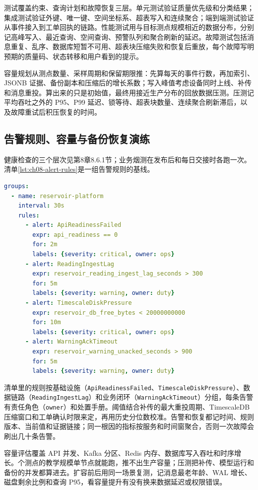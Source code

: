 测试覆盖约束、查询计划和故障恢复三层。单元测试验证质量优先级和分类结果；集成测试验证外键、唯一键、空间坐标系、超表写入和连续聚合；端到端测试验证从事件接入到工单回执的链路。性能测试用与目标测点规模相近的数据分布，分别记高峰写入、最近查询、空间查询、预警队列和聚合刷新的延迟。故障测试包括消息重复、乱序、数据库短暂不可用、超表块压缩失败和恢复后重放，每个故障写明预期的质量码、状态转移和用户看到的提示。

容量规划从测点数量、采样周期和保留期限推：先算每天的事件行数，再加索引、JSONB 证据、备份副本和压缩后的增长系数；写入峰值考虑设备同时上线、补传和消息重投。算出来的只是初始值，最终用接近生产分布的回放数据压测。压测记平均吞吐之外的 P95、P99 延迟、锁等待、超表块数量、连续聚合刷新滞后，以及故障重试后积压恢复的时间。

\subsection{告警规则、容量与备份恢复演练}

健康检查的三个层次见第8章8.6.1节；业务烟测在发布后和每日交接时各跑一次。清单\ref{lst:ch08-alert-rules}是一组告警规则的基线。

\begin{lstlisting}[language=YAML,caption={监控指标与告警规则基线},label={lst:ch08-alert-rules}]
groups:
  - name: reservoir-platform
    interval: 30s
    rules:
      - alert: ApiReadinessFailed
        expr: api_readiness == 0
        for: 2m
        labels: {severity: critical, owner: ops}
      - alert: ReadingIngestLag
        expr: reservoir_reading_ingest_lag_seconds > 300
        for: 5m
        labels: {severity: warning, owner: duty}
      - alert: TimescaleDiskPressure
        expr: reservoir_db_free_bytes < 20000000000
        for: 10m
        labels: {severity: critical, owner: ops}
      - alert: WarningAckTimeout
        expr: reservoir_warning_unacked_seconds > 900
        for: 5m
        labels: {severity: warning, owner: duty}
\end{lstlisting}

清单里的规则按基础设施（\texttt{ApiReadinessFailed}、\texttt{TimescaleDiskPressure}）、数据链路（\texttt{ReadingIngestLag}）和业务闭环（\texttt{WarningAckTimeout}）分组，每条告警有责任角色（\texttt{owner}）和处置手册。阈值结合补传的最大重投周期、TimescaleDB 压缩窗口和工单确认时限来定，再用历史分位数校准。告警和恢复都记时间、规则版本、当前值和证据链接；同一根因的指标按服务和时间窗聚合，否则一次故障会刷出几十条告警。

容量评估覆盖 API 并发、Kafka 分区、Redis 内存、数据库写入吞吐和时序增长。\cpStationCount 个测点的教学规模单节点就能跑，推不出生产容量；压测把补传、模型运行和备份的并发都算进去。扩容前后用同一场景复测，记消息最老年龄、WAL 增长、磁盘剩余比例和查询 P95，看容量提升有没有换来数据延迟或权限错误。

